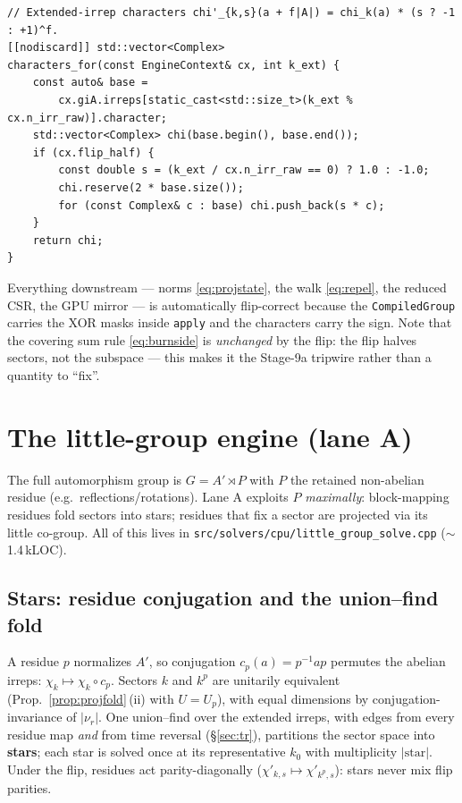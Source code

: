 \documentclass[11pt]{article}
\newcommand{\file}[1]{\texttt{\small #1}}
\begin{document}
\begin{lstlisting}
// Extended-irrep characters chi'_{k,s}(a + f|A|) = chi_k(a) * (s ? -1 : +1)^f.
[[nodiscard]] std::vector<Complex>
characters_for(const EngineContext& cx, int k_ext) {
    const auto& base =
        cx.giA.irreps[static_cast<std::size_t>(k_ext % cx.n_irr_raw)].character;
    std::vector<Complex> chi(base.begin(), base.end());
    if (cx.flip_half) {
        const double s = (k_ext / cx.n_irr_raw == 0) ? 1.0 : -1.0;
        chi.reserve(2 * base.size());
        for (const Complex& c : base) chi.push_back(s * c);
    }
    return chi;
}
\end{lstlisting}

Everything downstream --- norms \eqref{eq:projstate}, the walk
\eqref{eq:repel}, the reduced CSR, the GPU mirror --- is automatically
flip-correct because the \texttt{CompiledGroup} carries the XOR masks
inside \texttt{apply} and the characters carry the sign. Note that the
covering sum rule \eqref{eq:burnside} is \emph{unchanged} by the flip: the
flip halves sectors, not the subspace --- this makes it the Stage-9a
tripwire rather than a quantity to ``fix''.

\section{The little-group engine (lane A)}
\label{sec:littlegroup}

The full automorphism group is $G = A' \rtimes P$ with $P$ the retained
non-abelian residue (e.g.\ reflections/rotations). Lane A exploits $P$
\emph{maximally}: block-mapping residues fold sectors into stars; residues
that fix a sector are projected via its little co-group. All of this lives
in \file{src/solvers/cpu/little\_group\_solve.cpp} ($\sim$1.4\,kLOC).

\subsection{Stars: residue conjugation and the union--find fold}

A residue $p$ normalizes $A'$, so conjugation $c_p(a) = p^{-1} a p$
permutes the abelian irreps: $\chi_k \mapsto \chi_k \circ c_p$. Sectors
$k$ and $k^p$ are unitarily equivalent
(Prop.~\ref{prop:projfold}\,(ii) with $U = U_p$), with equal dimensions by
conjugation-invariance of $|\nu_r|$. One union--find over the extended
irreps, with edges from every residue map \emph{and} from time reversal
(\S\ref{sec:tr}), partitions the sector space into \textbf{stars}; each
star is solved once at its representative $k_0$ with multiplicity
$|\text{star}|$. Under the flip, residues act parity-diagonally
($\chi'_{k,s} \mapsto \chi'_{k^p,s}$): stars never mix flip parities.
\end{document}

